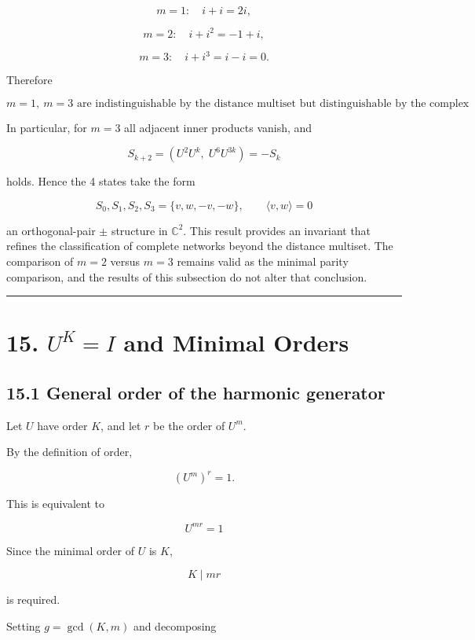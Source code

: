 \documentclass[
  a4paper,
]{article}
\begin{document}
\[
m=1:\quad i+i=2i,
\]

\[
m=2:\quad i+i^2=-1+i,
\]

\[
m=3:\quad i+i^3=i-i=0.
\]

Therefore

\[
\boxed{
m=1,\ m=3\text{ are indistinguishable by the distance multiset but distinguishable by the complex Gram structure}
}
\]

In particular, for \(m=3\) all adjacent inner products vanish, and

\[
S_{k+2}
=
\left(U^2 U^k,\;U^6 U^{3k}\right)
=
-S_k
\]

holds. Hence the 4 states take the form

\[
\boxed{
S_0,S_1,S_2,S_3
=
\{v,w,-v,-w\},
\qquad
\langle v,w\rangle=0
}
\]

an orthogonal-pair \(\pm\) structure in \(\mathbb C^2\). This result
provides an invariant that refines the classification of complete
networks beyond the distance multiset. The comparison of \(m=2\) versus
\(m=3\) remains valid as the minimal parity comparison, and the results
of this subsection do not alter that conclusion.

\begin{center}\rule{0.5\linewidth}{0.5pt}\end{center}

\section{\texorpdfstring{15. \(U^K=I\) and Minimal
Orders}{15. U\^{}K=I and Minimal Orders}}\label{uki-and-minimal-orders}

\subsection{15.1 General order of the harmonic
generator}\label{general-order-of-the-harmonic-generator}

Let \(U\) have order \(K\), and let \(r\) be the order of \(U^m\).

By the definition of order,

\[
(U^m)^r=1.
\]

This is equivalent to

\[
U^{mr}=1
\]

Since the minimal order of \(U\) is \(K\),

\[
K\mid mr
\]

is required.

Setting \(g=\gcd(K,m)\) and decomposing
\end{document}
